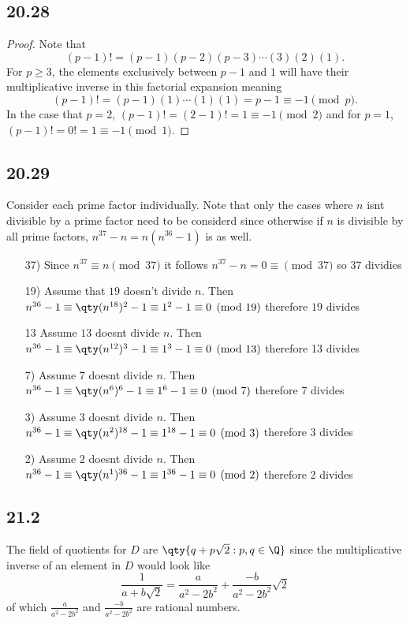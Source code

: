\documentclass[12pt,titlepage]{extarticle}
\begin{document}
\subsection*{20.28}
\begin{proof}
    Note that
    \[
        (p-1)! = (p-1)(p-2)(p-3) \cdots (3)(2)(1)
    .\]
    For $p \geq 3$, the elements exclusively between $p-1$ and $1$ will have their multiplicative inverse in this factorial expansion meaning
    \[
        (p-1)! = (p-1)(1)\cdots(1)(1) = p - 1 \equiv -1 \pmod{p}
    .\]
    In the case that $p = 2$, $(p-1)! = (2 - 1)! = 1 \equiv -1 \pmod{2}$ and for $p = 1$, $(p-1)! = 0! = 1 \equiv -1 \pmod{1}$.
\end{proof}

\subsection*{20.29}
Consider each prime factor individually. Note that only the cases where $n$ isnt divisible by a prime factor need to be considerd since otherwise if $n$ is divisible by all prime factors, $n^{37} - n = n(n^{36} - 1)$ is as well.

\begin{enumerate}
    \item[37)]
        Since $n^{37} \equiv n \pmod{37}$ it follows $n^{37} - n = 0 \equiv \pmod{37}$ so $37$ dividies
    \item[19)]
        Assume that $19$ doesn't divide $n$. Then $n^{36} - 1 \equiv \qty(n^{18})^2 - 1 \equiv 1^2 - 1 \equiv 0 \pmod{19}$ therefore $19$ divides
    \item[13]
        Assume $13$ doesnt divide $n$. Then $n^{36} - 1 \equiv \qty(n^{12})^3 - 1 \equiv 1^3 - 1 \equiv 0 \pmod{13}$ therefore 13 divides
    \item[7)]
        Assume $7$ doesnt divide $n$. Then $n^{36} - 1 \equiv \qty(n^{6})^6 - 1 \equiv 1^6 - 1 \equiv 0 \pmod{7}$ therefore 7 divides
    \item[3)]
        Assume $3$ doesnt divide $n$. Then $n^{36} - 1 \equiv \qty(n^{2})^{18} - 1 \equiv 1^{18} - 1 \equiv 0 \pmod{3}$ therefore 3 divides
    \item[2)]
        Assume $2$ doesnt divide $n$. Then $n^{36} - 1 \equiv \qty(n^1)^{36} - 1 \equiv 1^{36} - 1 \equiv 0 \pmod{2}$ therefore 2 divides
\end{enumerate}

\subsection*{21.2}
The field of quotients for $D$ are $\qty{q + p\sqrt{2} : p,q \in \Q}$ since the multiplicative inverse of an element in $D$ would look like
\[
    \frac{1}{a + b \sqrt{2}} = \frac{a}{a^2 - 2b^2} + \frac{-b}{a^2 - 2b^2} \sqrt{2}
\]
of which $\frac{a}{a^2 - 2b^2}$ and $\frac{-b}{a^2 - 2b^2}$ are rational numbers.
\end{document}
